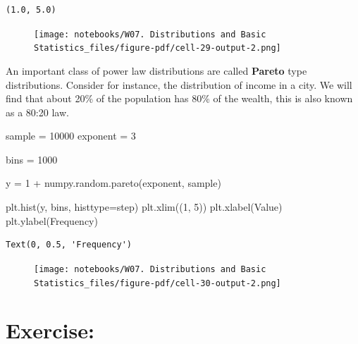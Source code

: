 \documentclass[
  letterpaper,
  DIV=11,
  numbers=noendperiod]{scrreprt}
\newenvironment{Shaded}{\begin{snugshade}}{\end{snugshade}}
\newcommand{\DecValTok}[1]{\textcolor[rgb]{0.68,0.00,0.00}{#1}}
\newcommand{\NormalTok}[1]{\textcolor[rgb]{0.00,0.23,0.31}{#1}}
\newcommand{\OperatorTok}[1]{\textcolor[rgb]{0.37,0.37,0.37}{#1}}
\newcommand{\StringTok}[1]{\textcolor[rgb]{0.13,0.47,0.30}{#1}}
\begin{document}
\begin{verbatim}
(1.0, 5.0)
\end{verbatim}

\begin{figure}[H]

{\centering \texttt{[image: notebooks/W07. Distributions and Basic Statistics\_files/figure-pdf/cell-29-output-2.png]}

}

\end{figure}

An important class of power law distributions are called \textbf{Pareto}
type distributions. Consider for instance, the distribution of income in
a city. We will find that about 20\% of the population has 80\% of the
wealth, this is also known as a 80:20 law.

\begin{Shaded}
\begin{Highlighting}[]
\NormalTok{sample }\OperatorTok{=} \DecValTok{10000}
\NormalTok{exponent }\OperatorTok{=} \DecValTok{3}

\NormalTok{bins }\OperatorTok{=} \DecValTok{1000}


\NormalTok{y }\OperatorTok{=} \DecValTok{1} \OperatorTok{+}\NormalTok{ numpy.random.pareto(exponent, sample)}

\NormalTok{plt.hist(y, bins, histtype}\OperatorTok{=}\StringTok{\textquotesingle{}step\textquotesingle{}}\NormalTok{)}
\NormalTok{plt.xlim((}\DecValTok{1}\NormalTok{, }\DecValTok{5}\NormalTok{))}
\NormalTok{plt.xlabel(}\StringTok{\textquotesingle{}Value\textquotesingle{}}\NormalTok{)}
\NormalTok{plt.ylabel(}\StringTok{\textquotesingle{}Frequency\textquotesingle{}}\NormalTok{)}
\end{Highlighting}
\end{Shaded}

\begin{verbatim}
Text(0, 0.5, 'Frequency')
\end{verbatim}

\begin{figure}[H]

{\centering \texttt{[image: notebooks/W07. Distributions and Basic Statistics\_files/figure-pdf/cell-30-output-2.png]}

}

\end{figure}

\hypertarget{exercise-20}{%
\section{Exercise:}\label{exercise-20}}
\end{document}
